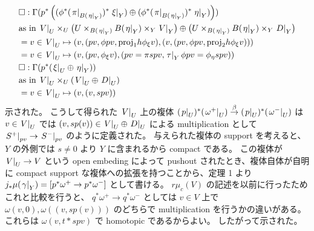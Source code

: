 \begin{Proof}
\begin{align*}
    &\square : \Gamma(p^* \left( (\phi^* (\left. {\pi} \right| _{B(\left. {\eta} \right| _{Y})})^* \left. {\xi} \right| _{Y}) \oplus (\phi^* (\left. {\pi} \right| _{B(\left. {\eta} \right| _{Y})})^* \left. {\eta} \right| _{Y}) \right)) \\
    &\text{as in} \, \left. {V} \right| _{U} \times_{U} \left(U \times_{B(\left. {\eta} \right| _{Y})} B(\left. {\eta} \right| _{Y}) \times_{Y} \left. {V} \right| _{Y}\right) \oplus \left(U \times_{B(\left. {\eta} \right| _{Y})} B(\left. {\eta} \right| _{Y}) \times_{Y} \left. {D} \right| _{Y} \right) \\
    &= v \in \left. {V} \right| _{U} \mapsto (v, (p v, \phi p v, \text{proj}_1 h \phi_{\xi} v), (v, (p v, \phi p v, \text{proj}_2 h \phi_{\xi} v))) \\
    &= v \in \left. {V} \right| _{U} \mapsto (v, (p v, \phi_{\xi} v), (p v = \pi s p v, \left. {\tau} \right| _{Y} \phi p v = \phi_{\eta} s p v)) \\
    &\square : \Gamma(p^* (\left. {\xi} \right| _{U} \oplus \left. {\eta} \right| _{Y})) \\
    &\text{as in} \, \left. {V} \right| _{U} \times_{U} (\left. {V} \right| _{U} \oplus \left. {D} \right| _{U}) \\
    &= v \in \left. {V} \right| _{U} \mapsto (v, (v, sp v)) \\
  \end{align*}
  示された。
\itemthen
  こうして得られた \(\left. {V} \right| _{U}\) 上の複体 \((\left. {p} \right| _{U})^* (\left. {\omega^{+}} \right| _{U}) \overset{\beta}{\to} (\left. {p} \right| _{U})^* (\left. {\omega^{-}} \right| _{U})\) は \(v \in \left. {V} \right| _{U}\) では \((v, sp(v)) \in \left. {V} \right| _{U} \oplus \left. {D} \right| _{U}\) による multiplication として \(\left. {S^{+}} \right| _{pv} \to \left. {S^{-}} \right| _{pv}\) のように定義された。
  与えられた複体の support を考えると、 \(Y\) の外側では \(s \not = 0\) より \(Y\) に含まれるから compact である。
  この複体が \(\left. {V} \right| _{U} \to V\) という open embeding によって pushout されたとき、複体自体が自明に compact support な複体への拡張を持つことから、定理 1 より \(j_* \mu(\left. {\gamma} \right| _{Y}) = [p^* \omega^{+} \to p^* \omega^{-}]\) として書ける。
  \(r \mu_c(V)\) の記述を以前に行ったためこれと比較を行うと、 \(q^* \omega^{+} \to q^* \omega^{-}\) としては \(v \in V\) 上で \(\omega(v,0), \omega((v,sp(v)))\) のどちらで multiplication を行うかの違いがある。
  これらは \(\omega(v, t* spv)\) で homotopic であるからよい。
  したがって示された。
\end{Proof}